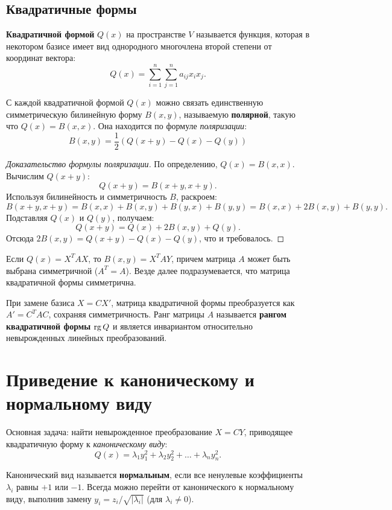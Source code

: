 \documentclass[12pt]{article}
\begin{document}
\subsection{Квадратичные формы}
\begin{definition}
\textbf{Квадратичной формой} $Q(x)$ на пространстве $V$ называется функция, которая в некотором базисе имеет вид однородного многочлена второй степени от координат вектора:
\[
Q(x) = \sum_{i=1}^n \sum_{j=1}^n a_{ij} x_i x_j.
\]
\end{definition}

С каждой квадратичной формой $Q(x)$ можно связать единственную симметрическую билинейную форму $B(x,y)$, называемую \textbf{полярной}, такую что $Q(x) = B(x,x)$. Она находится по формуле \textit{поляризации}:
\[
\boxed{B(x, y) = \frac{1}{2}(Q(x+y) - Q(x) - Q(y))}
\]

\begin{proof}[Доказательство формулы поляризации]
По определению, $Q(x) = B(x,x)$. Вычислим $Q(x+y)$:
\[
Q(x+y) = B(x+y, x+y).
\]
Используя билинейность и симметричность $B$, раскроем:
\[
B(x+y, x+y) = B(x,x) + B(x,y) + B(y,x) + B(y,y) = B(x,x) + 2B(x,y) + B(y,y).
\]
Подставляя $Q(x)$ и $Q(y)$, получаем:
\[
Q(x+y) = Q(x) + 2B(x,y) + Q(y).
\]
Отсюда $2B(x,y) = Q(x+y) - Q(x) - Q(y)$, что и требовалось.
\end{proof}

Если $Q(x) = X^T A X$, то $B(x,y) = X^T A Y$, причем матрица $A$ может быть выбрана симметричной ($A^T = A$). Везде далее подразумевается, что матрица квадратичной формы симметрична.

\begin{remark}
При замене базиса $X = C X'$, матрица квадратичной формы преобразуется как $A' = C^T A C$, сохраняя симметричность. Ранг матрицы $A$ называется \textbf{рангом квадратичной формы} $\operatorname{rg} Q$ и является инвариантом относительно невырожденных линейных преобразований.
\end{remark}

\section{Приведение к каноническому и нормальному виду}
Основная задача: найти невырожденное преобразование $X = CY$, приводящее квадратичную форму к \textit{каноническому виду}:
\[
Q(x) = \lambda_1 y_1^2 + \lambda_2 y_2^2 + \dots + \lambda_n y_n^2.
\]

\begin{definition}
Канонический вид называется \textbf{нормальным}, если все ненулевые коэффициенты $\lambda_i$ равны $+1$ или $-1$. Всегда можно перейти от канонического к нормальному виду, выполнив замену $y_i = z_i / \sqrt{|\lambda_i|}$ (для $\lambda_i \neq 0$).
\end{definition}
\end{document}
